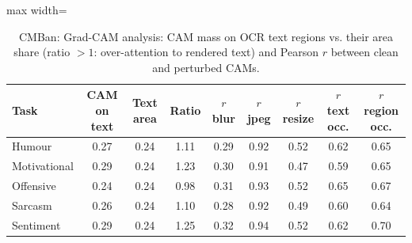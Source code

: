 \begin{table}[t]
\centering
\small
\caption{CMBan: Grad-CAM analysis: CAM mass on OCR text regions vs. their area share (ratio $>1$: over-attention to rendered text) and Pearson $r$ between clean and perturbed CAMs.}
\label{tab:gradcam_cmban}
\begin{adjustbox}{max width=\columnwidth}
\begin{tabular}{lcccccccc}
\toprule
Task & CAM on text & Text area & Ratio & $r$ blur & $r$ jpeg & $r$ resize & $r$ text occ. & $r$ region occ. \\
\midrule
Humour & 0.27 & 0.24 & 1.11 & 0.29 & 0.92 & 0.52 & 0.62 & 0.65 \\
Motivational & 0.29 & 0.24 & 1.23 & 0.30 & 0.91 & 0.47 & 0.59 & 0.65 \\
Offensive & 0.24 & 0.24 & 0.98 & 0.31 & 0.93 & 0.52 & 0.65 & 0.67 \\
Sarcasm & 0.26 & 0.24 & 1.10 & 0.28 & 0.92 & 0.49 & 0.60 & 0.64 \\
Sentiment & 0.29 & 0.24 & 1.25 & 0.32 & 0.94 & 0.52 & 0.62 & 0.70 \\
\bottomrule
\end{tabular}
\end{adjustbox}
\end{table}
